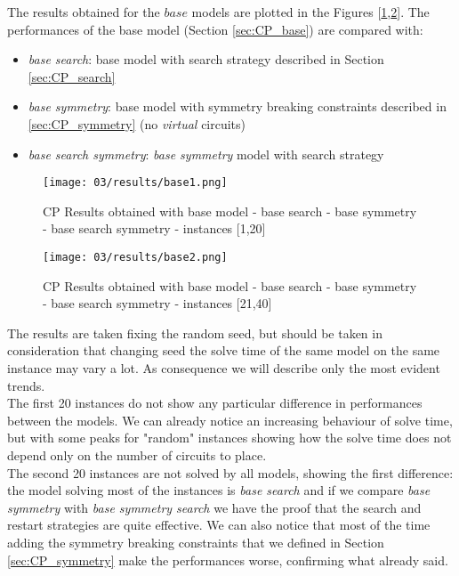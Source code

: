 The results obtained for the \(base\) models are plotted in the Figures [\ref{fig:CP_results_base1},\ref{fig:CP_results_base2}].
The performances of the base model (Section \ref{sec:CP_base}) are compared with:
\begin{itemize}
  \item \textit{base search}: base model with search strategy described in Section \ref{sec:CP_search}
  \item \textit{base symmetry}: base model with symmetry breaking constraints described in \ref{sec:CP_symmetry} (no \textit{virtual} circuits)
  \item \textit{base search symmetry}: \textit{base symmetry} model with search strategy
\end{itemize}

\begin{figure}[H]
  \centering
  \texttt{[image: 03/results/base1.png]}
  \caption{
    CP Results obtained with base model - base search - base symmetry - base search symmetry - instances [1,20]
  }
  \label{fig:CP_results_base1}
\end{figure}
\begin{figure}[H]
  \centering
  \texttt{[image: 03/results/base2.png]}
  \caption{
    CP Results obtained with base model - base search - base symmetry - base search symmetry - instances [21,40]
  }
  \label{fig:CP_results_base2}
\end{figure}

The results are taken fixing the random seed, but should be taken in consideration that changing seed
the solve time of the same model on the same instance may vary a lot. As consequence we will describe 
only the most evident trends.\\

The first 20 instances do not show any particular difference in performances between the models.
We can already notice an increasing behaviour of solve time, but with some peaks for "random" instances showing 
how the solve time does not depend only on the number of circuits to place. \\

The second 20 instances are not solved by all models, showing the first difference: the model solving 
most of the instances is \textit{base search} and if we compare \textit{base symmetry} with 
\textit{base symmetry search} we have the proof that the search and restart strategies are quite effective.
We can also notice that most of the time adding the symmetry breaking constraints that we defined in 
Section \ref{sec:CP_symmetry} make the performances worse, confirming what already said.\\

